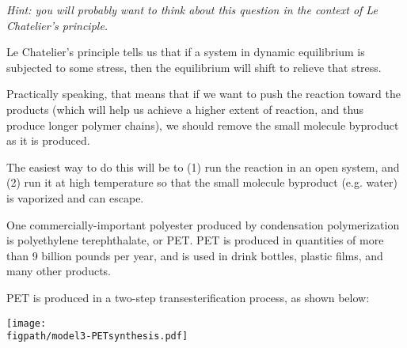 \begin{activity}
\begin{ctqs}
			\emph{Hint: you will probably want to think about this question in the context of Le Chatelier's principle.}
		
			\begin{solution}[2.5in]
			
				Le Chatelier's principle tells us that if a system in dynamic equilibrium is subjected to some stress, then the equilibrium will shift to relieve that stress.
				
				Practically speaking, that means that if we want to push the reaction toward the products (which will help us achieve a higher extent of reaction, and thus produce longer polymer chains), we should remove the small molecule byproduct as it is produced.
				
				The easiest way to do this will be to (1) run the reaction in an open system, and (2) run it at high temperature so that the small molecule byproduct (e.g. water) is vaporized and can escape.
			
			\end{solution}
		
\end{ctqs}

\clearpage
\begin{model}
\label{\labelbase:mdl:PET}

One commercially-important polyester produced by condensation polymerization is polyethylene terephthalate, or PET.
PET is produced in quantities of more than 9 billion pounds per year, and is used in drink bottles, plastic films, and many other products.

PET is produced in a two-step transesterification process, as shown below:
	
		\vspace{0.1in}
		\centerline{\texttt{[image: \\figpath/model3-PETsynthesis.pdf]}}

\end{model}

\begin{ctqs}
		
		
		
		

\end{ctqs}
\end{activity}

